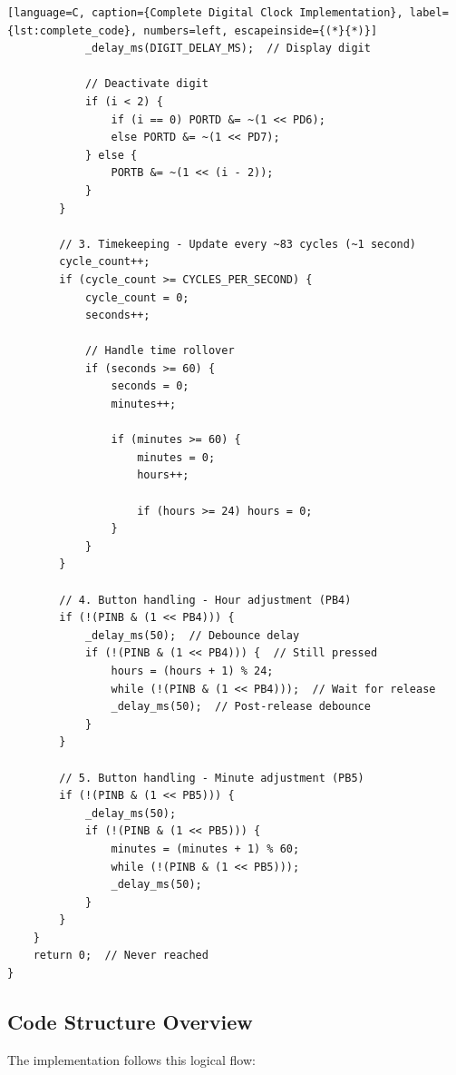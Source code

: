 \documentclass{article}
\begin{document}
\begin{lstlisting}[language=C, caption={Complete Digital Clock Implementation}, label={lst:complete_code}, numbers=left, escapeinside={(*}{*)}]
            _delay_ms(DIGIT_DELAY_MS);  // Display digit
            
            // Deactivate digit
            if (i < 2) {
                if (i == 0) PORTD &= ~(1 << PD6);
                else PORTD &= ~(1 << PD7);
            } else {
                PORTB &= ~(1 << (i - 2));
            }
        }

        // 3. Timekeeping - Update every ~83 cycles (~1 second)
        cycle_count++;
        if (cycle_count >= CYCLES_PER_SECOND) {
            cycle_count = 0;
            seconds++;
            
            // Handle time rollover
            if (seconds >= 60) {
                seconds = 0;
                minutes++;
                
                if (minutes >= 60) {
                    minutes = 0;
                    hours++;
                    
                    if (hours >= 24) hours = 0;
                }
            }
        }

        // 4. Button handling - Hour adjustment (PB4)
        if (!(PINB & (1 << PB4))) {
            _delay_ms(50);  // Debounce delay
            if (!(PINB & (1 << PB4))) {  // Still pressed
                hours = (hours + 1) % 24;
                while (!(PINB & (1 << PB4)));  // Wait for release
                _delay_ms(50);  // Post-release debounce
            }
        }

        // 5. Button handling - Minute adjustment (PB5)
        if (!(PINB & (1 << PB5))) {
            _delay_ms(50);
            if (!(PINB & (1 << PB5))) {
                minutes = (minutes + 1) % 60;
                while (!(PINB & (1 << PB5)));
                _delay_ms(50);
            }
        }
    }
    return 0;  // Never reached
}
\end{lstlisting}

\subsection{Code Structure Overview}
The implementation follows this logical flow:
\end{document}
